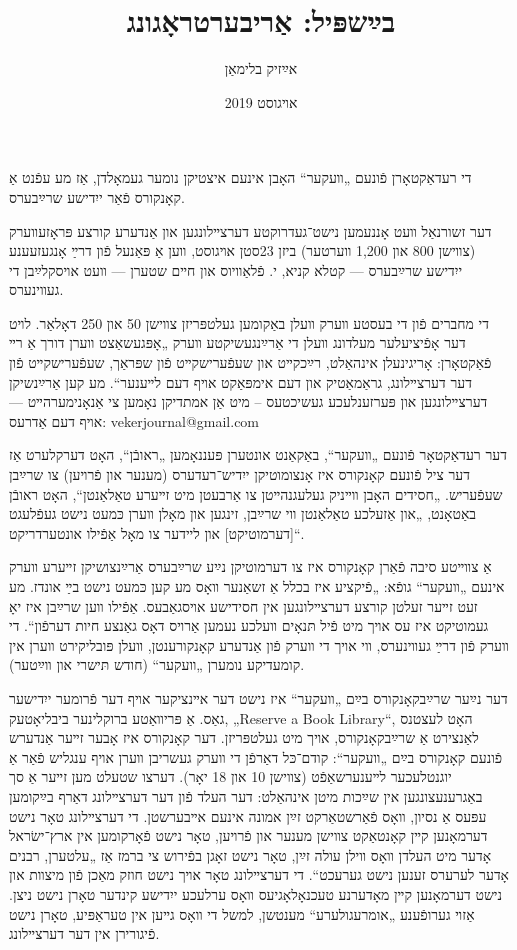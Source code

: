 \documentclass[12pt, draft]{article}
\title{בײַשפּיל: אַריבערטראָגונג}
\author{אײַזיק בלימאַן}
\date{אױגוסט 2019}
\begin{document}

\maketitle

די רעדאַקטאָרן פֿונעם „װעקער“ האָבן אינעם איצטיקן נומער געמאָלדן, אַז מע עפֿנט אַ קאָנקורס פֿאַר ייִדישע שרײַבערס.

דער זשורנאַל װעט אָננעמען נישט־געדרוקטע דערצײלונגען און אַנדערע קורצע פּראָזעװערק (צװישן 800 און 1,200 װערטער) ביזן 23סטן אױגוסט, װען אַ פּאַנעל פֿון דרײַ אָנגעזעענע ייִדישע שרײַבערס — קטלא קניא, י. פֿלאַװיוס און חײם שטערן — װעט אױסקלײַבן די געװינערס.

די מחברים פֿון די בעסטע װערק װעלן באַקומען געלטפּריזן צװישן 50 און 250 דאָלאַר. לױט דער אָפֿיציעלער מעלדונג װעלן די אַרײַנגעשיקטע װערק „אָפּגעשאַצט װערן דורך אַ רײ פֿאַקטאָרן: אָריגינעלן אינהאַלט, רײַכקײט און שעפֿערישקײט פֿון שפּראַך, שעפֿערישקײט פֿון דער דערצײלונג, גראַמאַטיק און דעם אימפּאַקט אױף דעם לײענער“. מע קען אַרײַנשיקן דערצײלונגען און פּערזענלעכע געשיכטעס – מיט אַן אמתדיקן נאָמען צי אַנאָנימערהײט — אױף דעם אַדרעס: vekerjournal@gmail.com

דער רעדאַקטאָר פֿונעם „װעקער“, באַקאַנט אונטערן פּעננאָמען „ראובֿן“, האָט דערקלערט אַז דער ציל פֿונעם קאָנקורס איז אָנצומוטיקן ייִדיש־רעדערס (מענער און פֿרױען) צו שרײַבן שעפֿעריש. „חסידים האָבן װײניק געלעגנהײטן צו אַרבעטן מיט זײערע טאַלאַנטן“, האָט ראובֿן באַטאָנט, „און אַזעלכע טאַלאַנטן װי שרײַבן, זינגען און מאָלן װערן כּמעט נישט געפֿלעגט [דערמוטיקט] און ליידער צו מאָל אַפֿילו אונטערדריקט“.

אַ צװײטע סיבה פֿאַרן קאָנקורס איז צו דערמוטיקן נײַע שרײַבערס אַרײַנצושיקן זײערע װערק אינעם „װעקער“ גופֿא: „פֿיקציע איז בכלל אַ זשאַנער װאָס מע קען כּמעט נישט בײַ אונדז. מע זעט זײער זעלטן קורצע דערצײלונגען אין חסידישע אױסגאַבעס. אַפֿילו װען שרײַבן איז יאָ געמוטיקט איז עס אױך מיט פֿיל תּנאָים װעלכע נעמען אַרױס דאָס גאַנצע חיות דערפֿון“. די װערק פֿון דרײַ געװינערס, װי אױך די װערק פֿון אַנדערע קאָנקורענטן, װעלן פּובליקירט װערן אין קומעדיקע נומערן „װעקער“ (חודש תּישרי און װײַטער).

דער נײַער שרײַבקאָנקורס בײַם „װעקער“ איז נישט דער אײנציקער אױף דער פֿרומער ייִדישער גאַס. אַ פּריװאַטע ברוקלינער ביבליאָטעק, „Reserve a Book Library“, האָט לעצטנס לאַנצירט אַ שרײַבקאָנקורס, אױך מיט געלטפּריזן. דער קאָנקורס איז אָבער זײער אַנדערש פֿונעם קאָנקורס בײַם „װעקער“: קודם־כּל דאַרפֿן די װערק געשריבן װערן אױף ענגליש פֿאַר אַ יוגנטלעכער לײענערשאַפֿט (צװישן 10 און 18 יאָר). דערצו שטעלט מען זײער אַ סך באַגרענעצונגען אין שײַכות מיטן אינהאַלט: דער העלד פֿון דער דערצײלונג דאַרף בײַקומען עפּעס אַ נסיון, װאָס פֿאַרשטאַרקט זײַן אמונה אינעם אײבערשטן. די דערצײלונג טאָר נישט דערמאָנען קײן קאָנטאַקט צװישן מענער און פֿרױען, טאָר נישט פֿאָרקומען אין ארץ־ישׂראל אָדער מיט העלדן װאָס װילן עולה זײַן, טאָר נישט זאָגן בפֿירוש צי ברמז אַז „עלטערן, רבנים אָדער לערערס זענען נישט גערעכט“. די דערצײלונג טאָר אױך נישט חוזק מאַכן פֿון מיצװת און נישט דערמאָנען קײן מאָדערנע טעכנאָלאָגיעס װאָס ערלעכע ייִדישע קינדער טאָרן נישט ניצן. אַזױ גערופֿענע „אומרעגולערע“ מענטשן, למשל די װאָס גײען אין טעראַפּיע, טאָרן נישט פֿיגורירן אין דער דערצײלונג.
\end{document}
